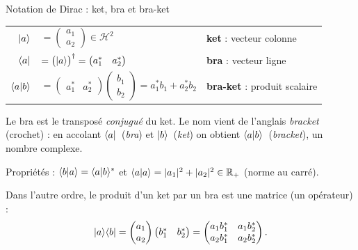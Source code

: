 \begin{definition}{Notation de Dirac : ket, bra et bra-ket}
\begin{center}
\begin{tabular}{@{}r@{\hspace{0.5em}}l@{\hspace{2em}}l@{}}
  {\Large\color{insarouge}$|a\rangle$}
    & $=\begin{pmatrix}a_1\\ a_2\end{pmatrix}\in\mathcal{H}^2$
    & \textbf{ket} : vecteur colonne \\[1.6ex]
  {\Large\color{insarouge}$\langle a|$}
    & $=\big(|a\rangle\big)^\dagger=\begin{pmatrix}a_1^* & a_2^*\end{pmatrix}$
    & \textbf{bra} : vecteur ligne \\[1.6ex]
  {\Large\color{insarouge}$\langle a|b\rangle$}
    & $=\begin{pmatrix}a_1^* & a_2^*\end{pmatrix}\begin{pmatrix}b_1\\ b_2\end{pmatrix}
       =a_1^*b_1+a_2^*b_2$
    & \textbf{bra-ket} : produit scalaire \\
\end{tabular}
\end{center}
Le bra est le transposé \emph{conjugué} du ket. Le nom vient de l'anglais
\emph{bracket} (crochet) : en accolant $\langle a|$~(\emph{bra}) et $|b\rangle$~(\emph{ket})
on obtient $\langle a|b\rangle$~(\emph{bracket}), un nombre complexe.

Propriétés : $\langle b|a\rangle=\langle a|b\rangle^*$ et
$\langle a|a\rangle=|a_1|^2+|a_2|^2\in\mathbb{R}_+$ (norme au carré).
\end{definition}

Dans l'autre ordre, le produit d'un ket par un bra est une matrice (un opérateur) :
\[
  |a\rangle\langle b|
  =\begin{pmatrix}a_1\\ a_2\end{pmatrix}\begin{pmatrix}b_1^* & b_2^*\end{pmatrix}
  =\begin{pmatrix}a_1b_1^* & a_1b_2^*\\ a_2b_1^* & a_2b_2^*\end{pmatrix}.
\]

